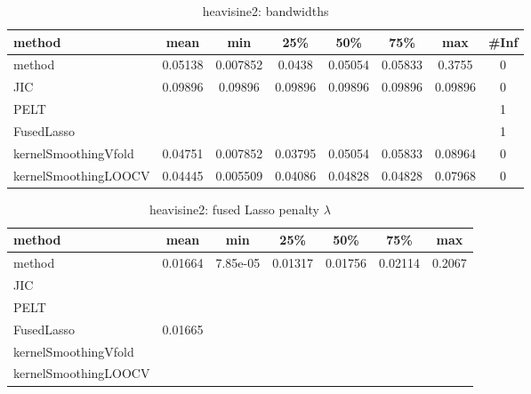 \begin{table}[ht]
\centering
\begin{tabular}{l|c|ccccc|c}
  \hline
method & mean & min & 25\% & 50\% & 75\% & max & \#Inf \\ 
  \hline
method & 0.05138 & 0.007852 & 0.0438 & 0.05054 & 0.05833 & 0.3755 &   0 \\ 
  JIC & 0.09896 & 0.09896 & 0.09896 & 0.09896 & 0.09896 & 0.09896 &   0 \\ 
  PELT &  &  &  &  &  &  &   1 \\ 
  FusedLasso &  &  &  &  &  &  &   1 \\ 
  kernelSmoothingVfold & 0.04751 & 0.007852 & 0.03795 & 0.05054 & 0.05833 & 0.08964 &   0 \\ 
  kernelSmoothingLOOCV & 0.04445 & 0.005509 & 0.04086 & 0.04828 & 0.04828 & 0.07968 &   0 \\ 
   \hline
\end{tabular}
\caption{heavisine2: bandwidths} 
\label{tab:heavisine2Bandwidths}
\end{table}
\begin{table}[ht]
\centering
\begin{tabular}{l|c|ccccc}
  \hline
method & mean & min & 25\% & 50\% & 75\% & max \\ 
  \hline
method & 0.01664 & 7.85e-05 & 0.01317 & 0.01756 & 0.02114 & 0.2067 \\ 
  JIC &  &  &  &  &  &  \\ 
  PELT &  &  &  &  &  &  \\ 
  FusedLasso & 0.01665 &  &  &  &  &  \\ 
  kernelSmoothingVfold &  &  &  &  &  &  \\ 
  kernelSmoothingLOOCV &  &  &  &  &  &  \\ 
   \hline
\end{tabular}
\caption{heavisine2: fused Lasso penalty $\lambda$} 
\label{tab:heavisine2Lambdas}
\end{table}
